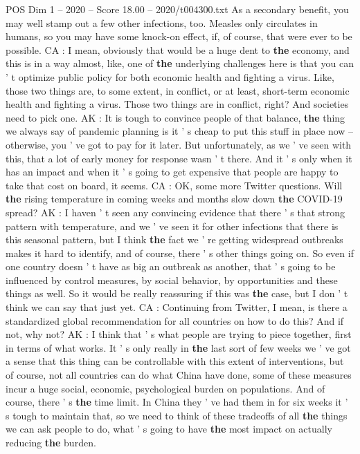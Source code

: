 \begin{textsample}{POS Dim 1 – 2020 – Score 18.00 – 2020/t004300.txt}
As a secondary benefit, you may well stamp out a few other infections, too.
Measles only circulates in humans, so you may have some knock-on effect, if, of course, that were ever to be possible.
CA : I mean, obviously that would be a huge dent to \textbf{the} economy, and this is in a way almost, like, one of \textbf{the} underlying challenges here is that you can ' t optimize public policy for both economic health and fighting a virus.
Like, those two things are, to some extent, in conflict, or at least, short-term economic health and fighting a virus.
Those two things are in conflict, right?
And societies need to pick one.
AK : It is tough to convince people of that balance, \textbf{the} thing we always say of pandemic planning is it ' s cheap to put this stuff in place now -- otherwise, you ' ve got to pay for it later.
But unfortunately, as we ' ve seen with this, that a lot of early money for response wasn ' t there.
And it ' s only when it has an impact and when it ' s going to get expensive that people are happy to take that cost on board, it seems.
CA : OK, some more Twitter questions.
Will \textbf{the} rising temperature in coming weeks and months slow down \textbf{the} COVID-19 spread?
AK : I haven ' t seen any convincing evidence that there ' s that strong pattern with temperature, and we ' ve seen it for other infections that there is this seasonal pattern, but I think \textbf{the} fact we ' re getting widespread outbreaks makes it hard to identify, and of course, there ' s other things going on.
So even if one country doesn ' t have as big an outbreak as another, that ' s going to be influenced by control measures, by social behavior, by opportunities and these things as well.
So it would be really reassuring if this was \textbf{the} case, but I don ' t think we can say that just yet.
CA : Continuing from Twitter, I mean, is there a standardized global recommendation for all countries on how to do this?
And if not, why not?
AK : I think that ' s what people are trying to piece together, first in terms of what works.
It ' s only really in \textbf{the} last sort of few weeks we ' ve got a sense that this thing can be controllable with this extent of interventions, but of course, not all countries can do what China have done, some of these measures incur a huge social, economic, psychological burden on populations.
And of course, there ' s \textbf{the} time limit.
In China they ' ve had them in for six weeks it ' s tough to maintain that, so we need to think of these tradeoffs of all \textbf{the} things we can ask people to do, what ' s going to have \textbf{the} most impact on actually reducing \textbf{the} burden.

\end{textsample}
